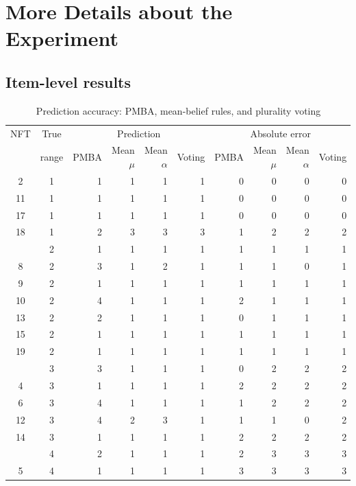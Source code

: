 \documentclass[12pt,reqno]{amsart}
\begin{document}
\clearpage
\section{More Details about the Experiment}\label{app:experiment}

\subsection{Item-level results}

\begin{table}[htbp]
\centering\tiny
\caption{Prediction accuracy: PMBA, mean-belief rules, and plurality voting}
\label{tab:item_predictions}
\setlength{\tabcolsep}{4pt}
\renewcommand{\arraystretch}{1.0}
\begin{tabular}{@{}ccrrrrrrrr@{}}
\toprule
NFT & True
& \multicolumn{4}{c}{Prediction}
& \multicolumn{4}{c}{Absolute error}\\
\cmidrule(lr){3-6}\cmidrule(lr){7-10}
& range
& PMBA & Mean $\mu$ & Mean $\alpha$ & Voting
& PMBA & Mean $\mu$ & Mean $\alpha$ & Voting\\
\midrule
2  & 1 & 1 & 1 & 1 & 1 & 0 & 0 & 0 & 0\\
11 & 1 & 1 & 1 & 1 & 1 & 0 & 0 & 0 & 0\\
17 & 1 & 1 & 1 & 1 & 1 & 0 & 0 & 0 & 0\\
18 & 1 & 2 & 3 & 3 & 3 & 1 & 2 & 2 & 2\\
\addlinespace[3pt]
7  & 2 & 1 & 1 & 1 & 1 & 1 & 1 & 1 & 1\\
8  & 2 & 3 & 1 & 2 & 1 & 1 & 1 & 0 & 1\\
9  & 2 & 1 & 1 & 1 & 1 & 1 & 1 & 1 & 1\\
10 & 2 & 4 & 1 & 1 & 1 & 2 & 1 & 1 & 1\\
13 & 2 & 2 & 1 & 1 & 1 & 0 & 1 & 1 & 1\\
15 & 2 & 1 & 1 & 1 & 1 & 1 & 1 & 1 & 1\\
19 & 2 & 1 & 1 & 1 & 1 & 1 & 1 & 1 & 1\\
\addlinespace[3pt]
1  & 3 & 3 & 1 & 1 & 1 & 0 & 2 & 2 & 2\\
4  & 3 & 1 & 1 & 1 & 1 & 2 & 2 & 2 & 2\\
6  & 3 & 4 & 1 & 1 & 1 & 1 & 2 & 2 & 2\\
12 & 3 & 4 & 2 & 3 & 1 & 1 & 1 & 0 & 2\\
14 & 3 & 1 & 1 & 1 & 1 & 2 & 2 & 2 & 2\\
\addlinespace[3pt]
3  & 4 & 2 & 1 & 1 & 1 & 2 & 3 & 3 & 3\\
5  & 4 & 1 & 1 & 1 & 1 & 3 & 3 & 3 & 3\\

\end{tabular}
\end{table}
\end{document}
